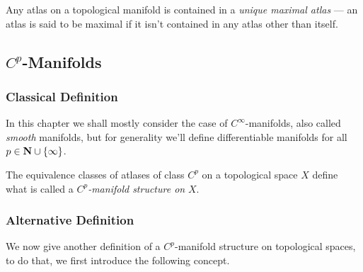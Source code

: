 \begin{corollary}
    \label{cor:unique-maximal-atlas}
    Any atlas on a topological manifold is contained in a \emph{unique maximal
        atlas} --- an atlas is said to be maximal if it isn't contained in any atlas
    other than itself.
\end{corollary}

\subsection{\texorpdfstring{\(C^p\)}{Cp}-Manifolds}

\subsubsection{Classical Definition}

In this chapter we shall mostly consider the case of \(C^{\infty}\)-manifolds,
also called \emph{smooth} manifolds, but for generality we'll define
differentiable manifolds for all \(p \in \mathbf{N} \cup \{\infty\}\).

\begin{definition}
    \label{def:Cp-manifold}
    The equivalence classes of atlases of class \(C^p\) on a topological space \(X\)
    define what is called a \emph{\(C^p\)-manifold structure on} \(X\).
\end{definition}

\subsubsection{Alternative Definition}

We now give another definition of a \(C^p\)-manifold structure on topological
spaces, to do that, we first introduce the following concept.

